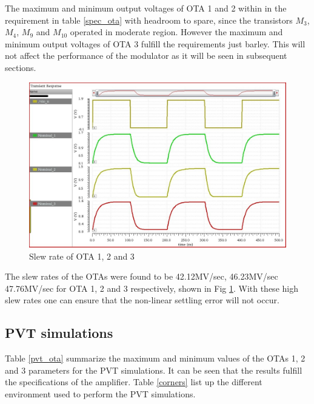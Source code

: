 The maximum and minimum output voltages of OTA 1 and 2 within in the requirement in table \ref{spec_ota} with headroom to spare, since the transistors $M_3$, $M_4$, $M_9$ and $M_10$ operated in moderate region. However the maximum and minimum output voltages of OTA 3 fulfill the requirements just barley. This will not affect the performance of the modulator as it will be seen in subsequent sections. 
\begin{figure}[H]
\centering
\includegraphics[width=\textwidth]{images/nominal_slew_rate_1_2_3.jpg}
\caption{Slew rate of OTA 1, 2 and 3 }
\label{slew_rate_out}
\end{figure}

The slew rates of the OTAs were found to be 42.12MV/sec, 46.23MV/sec 47.76MV/sec for OTA 1, 2 and 3 respectively, shown in Fig \ref{slew_rate_out}. With these high slew rates one can ensure that the non-linear settling error will not occur. 



\subsection{PVT simulations}
Table \ref{pvt_ota} summarize the maximum and minimum values of the OTAs 1, 2 and 3 parameters for the PVT simulations. It can be seen that the results fulfill the specifications of the amplifier. Table \ref{corners} list up the different environment used to perform the PVT simulations.


